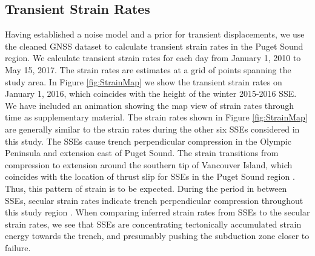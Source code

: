 \documentclass[extra,mreferee]{gji}
\begin{document}
\subsection{Transient Strain Rates}\label{sec:Results} 
Having established a noise model and a prior for transient displacements, we use the cleaned GNSS dataset to calculate transient strain rates in the Puget Sound region.  We calculate transient strain rates for each day from January 1, 2010 to May 15, 2017. The strain rates are estimates at a grid of points spanning the study area. In Figure \ref{fig:StrainMap} we show the transient strain rates on January 1, 2016, which coincides with the height of the winter 2015-2016 SSE. We have included an animation showing the map view of strain rates through time as supplementary material. The strain rates shown in Figure \ref{fig:StrainMap} are generally similar to the strain rates during the other six SSEs considered in this study. The SSEs cause trench perpendicular compression in the Olympic Peninsula and extension east of Puget Sound. The strain transitions from compression to extension around the southern tip of Vancouver Island, which coincides with the location of thrust slip for SSEs in the Puget Sound region \citep[e.g.,][]{Dragert2001,Wech2009,Schmidt2010}. Thus, this pattern of strain is to be expected. During the period in between SSEs, secular strain rates indicate trench perpendicular compression throughout this study region \citep{Murray2000,McCaffrey2007,McCaffrey2013}. When comparing inferred strain rates from SSEs to the secular strain rates, we see that SSEs are concentrating tectonically accumulated strain energy towards the trench, and presumably pushing the subduction zone closer to failure. 

\end{document}
